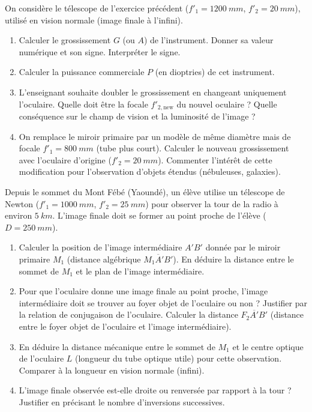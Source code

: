 \documentclass[11pt]{article}
\begin{document}
\begin{exercice}
On considère le télescope de l'exercice précédent ($f'_1 = \SI{1200}{mm}$, $f'_2 = \SI{20}{mm}$), utilisé en vision normale (image finale à l'infini).
\begin{enumerate}
    \item Calculer le grossissement $G$ (ou $A$) de l'instrument. Donner sa valeur numérique et son signe. Interpréter le signe.
    \item Calculer la puissance commerciale $P$ (en dioptries) de cet instrument.
    \item L'enseignant souhaite doubler le grossissement en changeant uniquement l'oculaire. Quelle doit être la focale $f'_{2,\text{new}}$ du nouvel oculaire ? Quelle conséquence sur le champ de vision et la luminosité de l'image ?
    \item On remplace le miroir primaire par un modèle de même diamètre mais de focale $f'_1 = \SI{800}{mm}$ (tube plus court). Calculer le nouveau grossissement avec l'oculaire d'origine ($f'_2 = \SI{20}{mm}$). Commenter l'intérêt de cette modification pour l'observation d'objets étendus (nébuleuses, galaxies).
\end{enumerate}
\end{exercice}

\begin{exercice}
Depuis le sommet du Mont Fébé (Yaoundé), un élève utilise un télescope de Newton ($f'_1 = \SI{1000}{mm}$, $f'_2 = \SI{25}{mm}$) pour observer la tour de la radio à environ $\SI{5}{km}$. L'image finale doit se former au point proche de l'élève ($D = \SI{250}{mm}$).
\begin{enumerate}
    \item Calculer la position de l'image intermédiaire $A'B'$ donnée par le miroir primaire $M_1$ (distance algébrique $\overline{M_1A'B'}$). En déduire la distance entre le sommet de $M_1$ et le plan de l'image intermédiaire.
    \item Pour que l'oculaire donne une image finale au point proche, l'image intermédiaire doit se trouver au foyer objet de l'oculaire ou non ? Justifier par la relation de conjugaison de l'oculaire. Calculer la distance $\overline{F_2A'B'}$ (distance entre le foyer objet de l'oculaire et l'image intermédiaire).
    \item En déduire la distance mécanique entre le sommet de $M_1$ et le centre optique de l'oculaire $L$ (longueur du tube optique utile) pour cette observation. Comparer à la longueur en vision normale (infini).
    \item L'image finale observée est-elle droite ou renversée par rapport à la tour ? Justifier en précisant le nombre d'inversions successives.
\end{enumerate}
\end{exercice}
\end{document}
